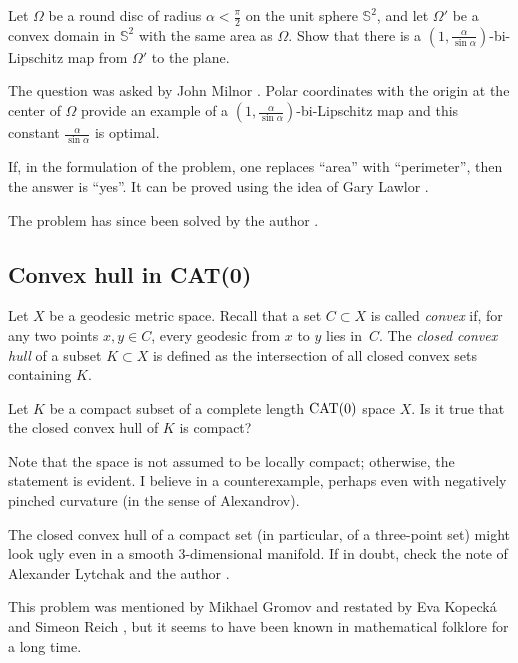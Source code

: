 \begin{pr}
Let $\Omega$ be a round disc of radius $\alpha<\tfrac\pi2$ on the unit sphere $\mathbb{S}^2$,
and let $\Omega'$ be a convex domain in $\mathbb{S}^2$ with the same area as $\Omega$. Show that there is a $(1,\tfrac{\alpha}{\sin\alpha})$-bi-Lipschitz map from $\Omega'$ to the plane.
\end{pr}

The question was asked by John Milnor \cite{milnor-cartography}.
Polar coordinates with the origin at the center of $\Omega$ provide an example of a $(1,\tfrac{\alpha}{\sin\alpha})$-bi-Lipschitz map and this constant $\tfrac{\alpha}{\sin\alpha}$ is optimal.

If, in the formulation of the problem, one replaces ``area''  with ``perimeter'',
then the answer is ``yes''.
It can be proved using the idea of Gary Lawlor \cite{lawlor}.

The problem has since been solved by the author \cite{petrunin2026}.

\subsection{Convex hull in CAT(0)}
\label{Convex hull in CAT(0)}

Let $X$ be a geodesic metric space.
Recall that a set $C\subset X$ is called \emph{convex} if, for any two points $x,y\in C$, every geodesic from $x$ to $y$ lies in~$C$.
The \emph{closed convex hull} of a subset $K\subset X$ is defined as the intersection of all closed convex sets containing $K$.

\begin{pr}
Let $K$ be a compact subset of a complete length $\mathop{\rm CAT}(0)$ space $X$.
Is it true that the closed convex hull of $K$ is compact?
\end{pr}

Note that the space is not assumed to be locally compact; otherwise, the statement is evident.
I believe in a counterexample, perhaps even with negatively pinched curvature (in the sense of Alexandrov).

The closed convex hull of a compact set (in particular, of a three-point set) might look ugly even in a smooth 3-dimensional manifold.
If in doubt, check the note of Alexander Lytchak and the author \cite{lytchak-petrunin}.

This problem was mentioned by Mikhael Gromov \cite[6.B$_1\text{(f)}$]{gromov-asymptotic}
and restated by Eva Kopeck\'a and Simeon Reich \cite{kopecka-reich}, 
but it seems to have been known in mathematical folklore for a long time.

